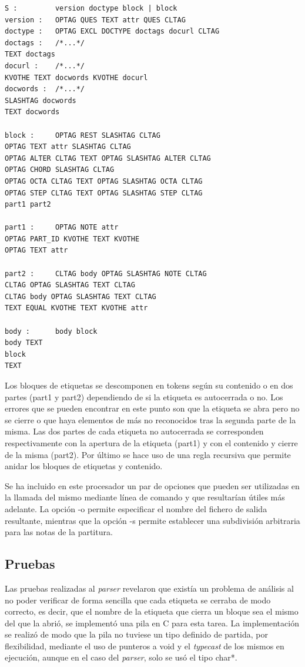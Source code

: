 \begin{verbatim}
S : 		version doctype block | block
version : 	OPTAG QUES TEXT attr QUES CLTAG
doctype : 	OPTAG EXCL DOCTYPE doctags docurl CLTAG
doctags : 	/*...*/
TEXT doctags
docurl : 	/*...*/
KVOTHE TEXT docwords KVOTHE docurl
docwords : 	/*...*/
SLASHTAG docwords
TEXT docwords

block : 	OPTAG REST SLASHTAG CLTAG
OPTAG TEXT attr SLASHTAG CLTAG
OPTAG ALTER CLTAG TEXT OPTAG SLASHTAG ALTER CLTAG
OPTAG CHORD SLASHTAG CLTAG
OPTAG OCTA CLTAG TEXT OPTAG SLASHTAG OCTA CLTAG
OPTAG STEP CLTAG TEXT OPTAG SLASHTAG STEP CLTAG
part1 part2

part1 : 	OPTAG NOTE attr
OPTAG PART_ID KVOTHE TEXT KVOTHE
OPTAG TEXT attr

part2 : 	CLTAG body OPTAG SLASHTAG NOTE CLTAG
CLTAG OPTAG SLASHTAG TEXT CLTAG
CLTAG body OPTAG SLASHTAG TEXT CLTAG
TEXT EQUAL KVOTHE TEXT KVOTHE attr

body : 		body block
body TEXT
block
TEXT
\end{verbatim}

Los bloques de etiquetas se descomponen en tokens según su contenido o en dos partes (part1 y part2) dependiendo de si la etiqueta es autocerrada o no. Los errores que se pueden encontrar en este punto son que la etiqueta se abra pero no se cierre o que haya elementos de más no reconocidos tras la segunda parte de la misma. Las dos partes de cada etiqueta no autocerrada se corresponden respectivamente con la apertura de la etiqueta (part1) y con el contenido y cierre de la misma (part2). Por último se hace uso de una regla recursiva que permite anidar los bloques de etiquetas y contenido.

Se ha incluido en este procesador un par de opciones que pueden ser utilizadas en la llamada del mismo mediante línea de comando y que resultarían útiles más adelante. La opción -o permite especificar el nombre del fichero de salida resultante, mientras que la opción -s permite establecer una subdivisión arbitraria para las notas de la partitura.

\subsection{Pruebas}
Las pruebas realizadas al \textit{parser} revelaron que existía un problema de análisis al no poder verificar de forma sencilla que cada etiqueta se cerraba de modo correcto, es decir, que el nombre de la etiqueta que cierra un bloque sea el mismo del que la abrió, se implementó una pila en C para esta tarea. La implementación se realizó de modo que la pila no tuviese un tipo definido de partida, por flexibilidad, mediante el uso de punteros a void y el \textit{typecast} de los mismos en ejecución, aunque en el caso del \textit{parser}, solo se usó el tipo char*.


